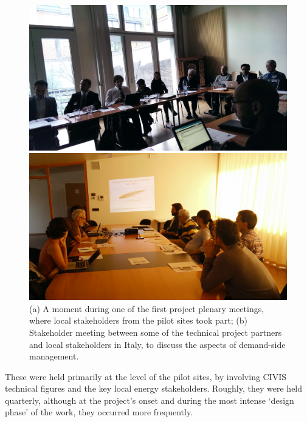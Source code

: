%
\begin{figure}
      \begin{center}
        \begin{minipage}[htb]{0.43\linewidth}    
        \includegraphics[width=1\linewidth]{img/Stkh_plenary1.jpg}
        \end{minipage}
 	\hfill 
         \begin{minipage}[htb]{0.55\linewidth}    
	        \includegraphics[width=1\linewidth]{img/Stkh_meeting_tou_crop.jpg} 
                \end{minipage}
      \end{center}
    \caption{(a) A moment during one of the first project plenary meetings, where local stakeholders from the pilot sites took part; (b) Stakeholder meeting between some of the technical project partners and
    local stakeholders in Italy, to discuss the aspects of demand-side management.
}
\label{fig:stkh_meetings}
\end{figure}
%

These were held primarily at the level of the pilot sites, by involving CIVIS technical figures and the
key local energy stakeholders. Roughly, they were held quarterly, although at the project's onset and during
the most intense `design phase' of the work, they occurred more frequently.

